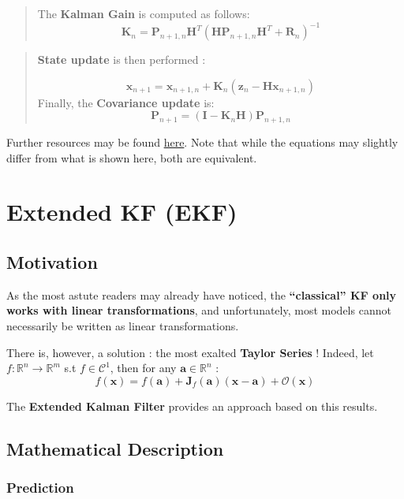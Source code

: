 \documentclass[12pt]{article}
\begin{document}
\begin{quote}
The \textbf{Kalman Gain} is computed as follows:
\[\boldsymbol K_n = \boldsymbol P_{n+1,n}\boldsymbol H^T (\boldsymbol H \boldsymbol P_{n+1,n}\boldsymbol H^T + \boldsymbol R_n)^{-1}\]
\end{quote}

\begin{quote}
\textbf{State update} is then performed :

\[
\boldsymbol x_{n+1} = \boldsymbol x_{n+1,n} + \boldsymbol K_n (\boldsymbol z_n - \boldsymbol H \boldsymbol x_{n+1,n})\]
Finally, the \textbf{Covariance update} is: \[
\boldsymbol P_{n+1} = (\boldsymbol I - \boldsymbol K_n \boldsymbol H)\boldsymbol P_{n+1,n}
\]
\end{quote}

Further resources may be found
\href{https://www.kalmanfilter.net/default.aspx}{here}. Note that while
the equations may slightly differ from what is shown here, both are
equivalent.

\section{Extended KF (EKF)}\label{extended-kf-ekf}

\subsection{Motivation}\label{motivation}

As the most astute readers may already have noticed, the
\textbf{``classical'' KF only works with linear transformations}, and
unfortunately, most models cannot necessarily be written as linear
transformations.

There is, however, a solution : the most exalted \textbf{Taylor Series}
! Indeed, let \(f:\mathbb{R}^n \rightarrow \mathbb{R}^m\) s.t
\(f \in \mathcal{C}^1\), then for any \(\boldsymbol a \in \mathbb{R}^n\)
:
\[f(\boldsymbol x) = f(\boldsymbol a) + \boldsymbol J_f(\boldsymbol a)(\boldsymbol x - \boldsymbol a) + \mathcal{O}(\boldsymbol x)\]

The \textbf{Extended Kalman Filter} provides an approach based on this
results.

\subsection{Mathematical Description}\label{mathematical-description-1}

\subsubsection{Prediction}\label{prediction-1}
\end{document}
